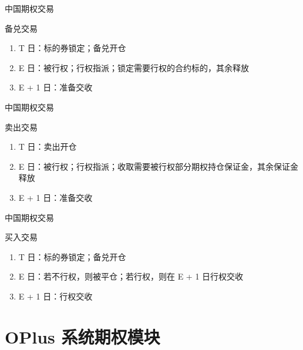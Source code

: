\documentclass[12pt]{ctexbeamer}	%
\begin{document}
\begin{frame}{中国期权交易}
  \begin{block}{备兑交易}
    \begin{enumerate}
      \item T 日：标的券锁定；备兑开仓
      \item E 日：被行权；行权指派；锁定需要行权的合约标的，其余释放
      \item E + 1 日：准备交收
    \end{enumerate}
  \end{block}
\end{frame}

\begin{frame}{中国期权交易}
  \begin{block}{卖出交易}
    \begin{enumerate}
      \item T 日：卖出开仓
      \item E 日：被行权；行权指派；收取需要被行权部分期权持仓保证金，其余保证金释放
      \item E + 1 日：准备交收
    \end{enumerate}
  \end{block}
\end{frame}

\begin{frame}{中国期权交易}
  \begin{block}{买入交易}
    \begin{enumerate}
      \item T 日：标的券锁定；备兑开仓
      \item E 日：若不行权，则被平仓；若行权，则在 E + 1 日行权交收
      \item E + 1 日：行权交收
    \end{enumerate}
  \end{block}
\end{frame}


\section{OPlus 系统期权模块}
\end{document}
